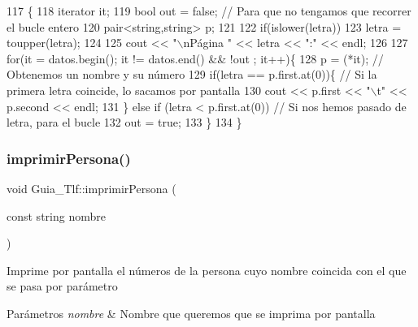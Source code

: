 \begin{DoxyCode}
117                                         \{
118      iterator it;
119      \textcolor{keywordtype}{bool} out = \textcolor{keyword}{false};                                                          \textcolor{comment}{// Para que no tengamos que
       recorrer el bucle entero}
120      pair<string,string> p;
121      
122      \textcolor{keywordflow}{if}(islower(letra))
123          letra = toupper(letra);
124      
125      cout << \textcolor{stringliteral}{"\(\backslash\)nPágina "} << letra << \textcolor{stringliteral}{":"} << endl;
126      
127      \textcolor{keywordflow}{for}(it = datos.begin(); it != datos.end() && !out ; it++)\{
128          p = (*it);                                                             \textcolor{comment}{// Obtenemos un nombre y su
       número}
129          \textcolor{keywordflow}{if}(letra == p.first.at(0))\{                                            \textcolor{comment}{// Si la primera letra
       coincide, lo sacamos por pantalla}
130              cout << p.first << \textcolor{stringliteral}{"\(\backslash\)t"} << p.second << endl;
131          \} \textcolor{keywordflow}{else} \textcolor{keywordflow}{if} (letra < p.first.at(0))                                      \textcolor{comment}{// Si nos hemos pasado de
       letra, para el bucle}
132              out = \textcolor{keyword}{true};
133      \}
134  \}
\end{DoxyCode}
\mbox{\label{classGuia__Tlf_a58dad69616b264d952fbf1944ea2a5e4}} 
\subsubsection{\texorpdfstring{imprimir\+Persona()}{imprimirPersona()}}
{\footnotesize\ttfamily void Guia\+\_\+\+Tlf\+::imprimir\+Persona (\begin{DoxyParamCaption}\item[{const string}]{nombre }\end{DoxyParamCaption})}

Imprime por pantalla el números de la persona cuyo nombre coincida con el que se pasa por parámetro 
\begin{DoxyParams}{Parámetros}
{\em nombre} & Nombre que queremos que se imprima por pantalla \\
\hline
\end{DoxyParams}


